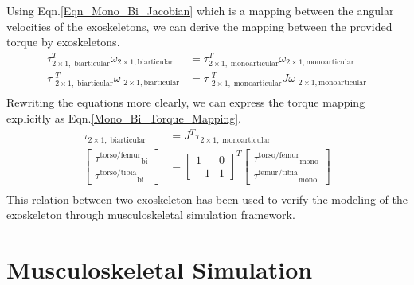 \documentclass[10pt,letterpaper]{article}
\begin{document}
Using Eqn.\eqref{Eqn_Mono_Bi_Jacobian} which is a mapping between the angular velocities of the exoskeletons, we can derive the mapping between the provided torque by exoskeletons.
\begin{equation*}
\begin{aligned}
\tau{}_{2\times 1,\;\mathrm{biarticular}}^T \omega {}_{2\times 1,\mathrm{biarticular}} &=\tau {}_{2\times 1,\;\mathrm{monoarticular}}^T \omega {}_{2\times 1,\mathrm{monoarticular}}\\
\tau {\;}_{2\times 1,\;\mathrm{biarticular}}^T \omega {\;}_{2\times 1,\mathrm{biarticular}} &=\tau {\;}_{2\times 1,\;\mathrm{monoarticular}}^T J\omega {\;}_{2\times 1,\mathrm{monoarticular}}\\
\end{aligned}
\end{equation*}
Rewriting the equations more clearly, we can express the torque mapping explicitly as Eqn.\ref{Mono_Bi_Torque_Mapping}.
\begin{equation}\label{Mono_Bi_Torque_Mapping}
\begin{aligned}
\tau_{2\times 1,\;\mathrm{biarticular}} &=J^T \tau_{2\times 1,\;\mathrm{monoarticular}}\\
\left\lbrack \begin{array}{c}
{\tau^{\mathrm{torso}/\mathrm{femur}} }_{\mathrm{bi}} \\
{\tau^{\mathrm{torso}/\mathrm{tibia}} }_{\mathrm{bi}} 
\end{array}\right\rbrack &={\left\lbrack \begin{array}{cc}
	1 & 0\\
	-1 & 1
	\end{array}\right\rbrack }^T \left\lbrack \begin{array}{c}
{\tau^{\mathrm{torso}/\mathrm{femur}} }_{\mathrm{mono}} \\
{\tau^{\mathrm{femur}/\mathrm{tibia}} }_{\mathrm{mono}} 
\end{array}\right\rbrack\\
\end{aligned}
\end{equation}
This relation between two exoskeleton has been used to verify the modeling of the exoskeleton through musculoskeletal simulation framework.
\section*{Musculoskeletal Simulation}
\end{document}
